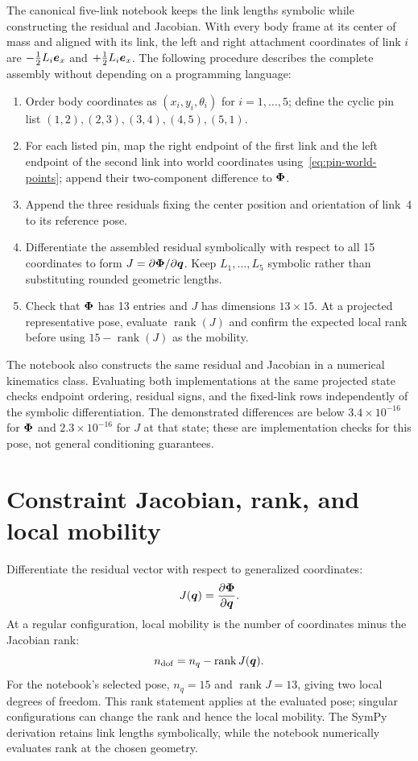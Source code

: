 \documentclass[../main.tex]{subfiles}
\begin{document}
The canonical five-link notebook keeps the link lengths symbolic while constructing the residual and Jacobian. With every body frame at its center of mass and aligned with its link, the left and right attachment coordinates of link $i$ are $-\tfrac12L_i\boldsymbol{e}_x$ and $+\tfrac12L_i\boldsymbol{e}_x$. The following procedure describes the complete assembly without depending on a programming language:
\begin{enumerate}
\item Order body coordinates as $(x_i,y_i,\theta_i)$ for $i=1,\ldots,5$; define the cyclic pin list $(1,2),(2,3),(3,4),(4,5),(5,1)$.
\item For each listed pin, map the right endpoint of the first link and the left endpoint of the second link into world coordinates using~\eqref{eq:pin-world-points}; append their two-component difference to $\boldsymbol{\Phi}$.
\item Append the three residuals fixing the center position and orientation of link~4 to its reference pose.
\item Differentiate the assembled residual symbolically with respect to all 15 coordinates to form $J=\partial\boldsymbol{\Phi}/\partial\boldsymbol{q}$. Keep $L_1,\ldots,L_5$ symbolic rather than substituting rounded geometric lengths.
\item Check that $\boldsymbol{\Phi}$ has 13 entries and $J$ has dimensions $13\times15$. At a projected representative pose, evaluate $\operatorname{rank}(J)$ and confirm the expected local rank before using $15-\operatorname{rank}(J)$ as the mobility.
\end{enumerate}
The notebook also constructs the same residual and Jacobian in a numerical kinematics class. Evaluating both implementations at the same projected state checks endpoint ordering, residual signs, and the fixed-link rows independently of the symbolic differentiation. The demonstrated differences are below $3.4\times10^{-16}$ for $\boldsymbol{\Phi}$ and $2.3\times10^{-16}$ for $J$ at that state; these are implementation checks for this pose, not general conditioning guarantees.

\section{Constraint Jacobian, rank, and local mobility}

Differentiate the residual vector with respect to generalized coordinates:
\begin{equation}
	J(\boldsymbol{q})=\frac{\partial\boldsymbol{\Phi}}{\partial\boldsymbol{q}}.
	\label{eq:constraint-jacobian}
\end{equation}
At a regular configuration, local mobility is the number of coordinates minus the Jacobian rank:
\begin{equation}
	n_{\mathrm{dof}}=n_q-\operatorname{rank}J(\boldsymbol{q}).
	\label{eq:local-mobility}
\end{equation}
For the notebook's selected pose, $n_q=15$ and $\operatorname{rank}J=13$, giving two local degrees of freedom. This rank statement applies at the evaluated pose; singular configurations can change the rank and hence the local mobility. The SymPy derivation retains link lengths symbolically, while the notebook numerically evaluates rank at the chosen geometry.
\end{document}
